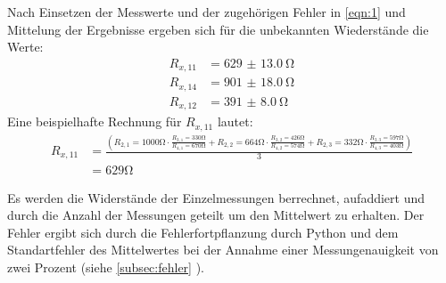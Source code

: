 \noindent Nach Einsetzen der Messwerte und der zugehörigen Fehler in
\autoref{eqn:1} und Mittelung der Ergebnisse ergeben sich für die unbekannten
Wiederstände die Werte:
\begin{align*}
       R_{x,11} &= \qty{629(13.0)}{\ohm}\\
       R_{x,14} &= \qty{901(18.0)}{\ohm}\\
       R_{x,12} &= \qty{391(8.0)}{\ohm}
\end{align*}
Eine beispielhafte Rechnung für $R_{x,11}$ lautet:
\begin{align*}
       R_{x,11}&= \frac{\left(R_{2,1}=1000 \unit{\ohm} \cdot
              \frac{R_{3,1}=330 \unit{\ohm}}{R_{4,1}=670 \unit{\ohm} }+R_{2,2}=664 \unit{\ohm} \cdot 
              \frac{R_{3,2}=426 \unit{\ohm}}{R_{4,2}=574 \unit{\ohm} }+R_{2,3}=332 \unit{\ohm} \cdot
              \frac{R_{3,3}=597 \unit{\ohm}}{R_{4,3}=403 \unit{\ohm} }\right)}{3} \\
               &= 629 \unit{\ohm}
\end{align*}

\noindent Es werden die Widerstände der Einzelmessungen berrechnet, aufaddiert und
durch die Anzahl der Messungen geteilt um den Mittelwert zu erhalten. 
Der Fehler ergibt sich durch die Fehlerfortpflanzung durch Python und dem
Standartfehler des Mittelwertes bei der Annahme einer Messungenauigkeit von
zwei Prozent (siehe \autoref{subsec:fehler} ).

